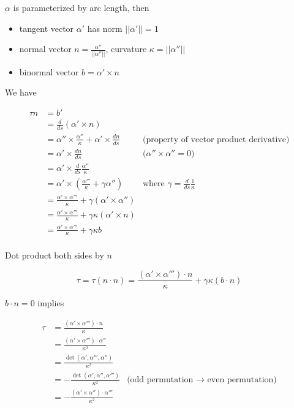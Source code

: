 \documentclass{article}
\begin{document}
$\alpha$ is parameterized by arc length, then 
\begin{itemize}
    \item tangent vector $\alpha'$ has norm $||\alpha'|| = 1$
    \item normal vector $n = \frac{\alpha''}{||\alpha''||}$, curvature $\kappa = ||\alpha''||$
    \item binormal vector $b = \alpha' \times n$
\end{itemize}

We have

\begin{align*}
    \tau n
        &= b' \\
        &= \frac{d}{ds}(\alpha' \times n) \\
        &= \alpha'' \times \frac{\alpha''}{\kappa} + \alpha' \times \frac{dn}{ds} &\text{(property of vector product derivative)}\\
        &= \alpha' \times \frac{dn}{ds} &\text{($\alpha'' \times \alpha'' = 0$)} \\
        &= \alpha' \times \frac{d}{ds} \frac{\alpha''}{\kappa} \\
        &= \alpha' \times \left(\frac{\alpha'''}{\kappa} + \gamma \alpha''\right) &\text{where $\gamma = \frac{d}{ds}\frac{1}{\kappa}$}\\
        &= \frac{\alpha' \times \alpha'''}{\kappa} + \gamma (\alpha' \times \alpha'')\\
        &= \frac{\alpha' \times \alpha'''}{\kappa} + \gamma \kappa (\alpha' \times n)\\
        &= \frac{\alpha' \times \alpha'''}{\kappa} + \gamma \kappa b\\
\end{align*}

Dot product both sides by $n$

$$
    \tau = \tau (n \cdot n) = \frac{(\alpha' \times \alpha''') \cdot n}{\kappa} + \gamma \kappa (b \cdot n)
$$

$b \cdot n = 0$ implies

\begin{align*}
    \tau
        &= \frac{(\alpha' \times \alpha''') \cdot n}{\kappa} \\
        &= \frac{(\alpha' \times \alpha''') \cdot \alpha''}{\kappa^2} \\
        &= \frac{\det (\alpha', \alpha''', \alpha'')}{\kappa^2} \\
        &= - \frac{\det (\alpha', \alpha'', \alpha''')}{\kappa^2} &\text{(odd permutation $\to$ even permutation)}\\
        &= - \frac{(\alpha' \times \alpha'') \cdot \alpha'''}{\kappa^2} \\
\end{align*}
\end{document}
